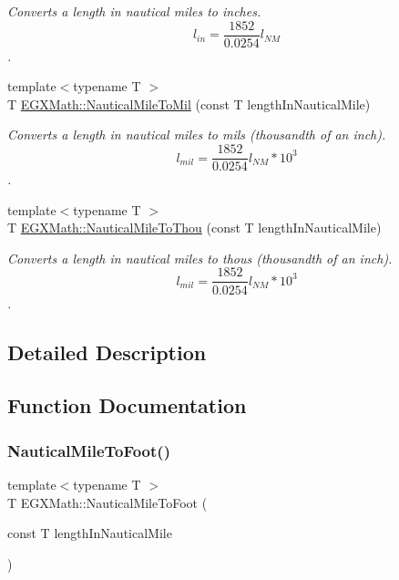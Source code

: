 \begin{DoxyCompactItemize}
\begin{DoxyCompactList}\small\item\em Converts a length in nautical miles to inches. \[ l_{in}= \frac{1852}{0.0254} l_{NM} \]. \end{DoxyCompactList}\item 
{\footnotesize template$<$typename T $>$ }\\T \mbox{\hyperlink{group___e_g_x_math-_conversions-_length_conversions-_nautical-_nautical_mile-_imperial_ga30322f1dff254ba1eff05b0d10617fe7}{E\+G\+X\+Math\+::\+Nautical\+Mile\+To\+Mil}} (const T length\+In\+Nautical\+Mile)
\begin{DoxyCompactList}\small\item\em Converts a length in nautical miles to mils (thousandth of an inch). \[ l_{mil}= \frac{1852}{0.0254} l_{NM} * 10^{3} \]. \end{DoxyCompactList}\item 
{\footnotesize template$<$typename T $>$ }\\T \mbox{\hyperlink{group___e_g_x_math-_conversions-_length_conversions-_nautical-_nautical_mile-_imperial_ga2791d7d115ca8640a88ce3180db9dddb}{E\+G\+X\+Math\+::\+Nautical\+Mile\+To\+Thou}} (const T length\+In\+Nautical\+Mile)
\begin{DoxyCompactList}\small\item\em Converts a length in nautical miles to thous (thousandth of an inch). \[ l_{mil}= \frac{1852}{0.0254} l_{NM} * 10^{3} \]. \end{DoxyCompactList}\end{DoxyCompactItemize}


\subsection{Detailed Description}


\subsection{Function Documentation}
\mbox{\label{group___e_g_x_math-_conversions-_length_conversions-_nautical-_nautical_mile-_imperial_ga5c74e872b454cc243bb0d77f0d8f76a1}} 
\subsubsection{\texorpdfstring{Nautical\+Mile\+To\+Foot()}{NauticalMileToFoot()}}
{\footnotesize\ttfamily template$<$typename T $>$ \\
T E\+G\+X\+Math\+::\+Nautical\+Mile\+To\+Foot (\begin{DoxyParamCaption}\item[{const T}]{length\+In\+Nautical\+Mile }\end{DoxyParamCaption})}



